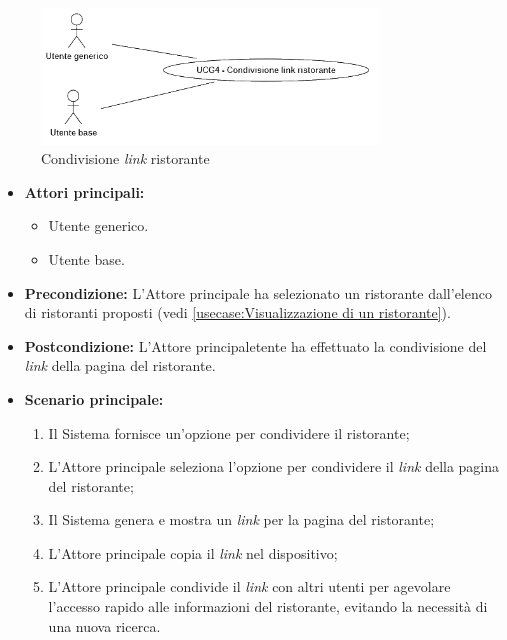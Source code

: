 \newpage
{}
\label{usecase:Condivisione link del ristorante}

\begin{figure}[h]
	\centering
	\includegraphics[width=0.8\textwidth]{./uml/UCG4.png} 
	\caption{Condivisione \textit{link} ristorante}
	\label{fig:UCG4}
  \end{figure}

\begin{itemize}
	\item \textbf{Attori principali:} 
	\begin{itemize}
		\item Utente generico.
		\item Utente base.
	\end{itemize}


	\item \textbf{Precondizione:}
	      L'Attore principale ha selezionato un ristorante dall'elenco di ristoranti
	      proposti (vedi \autoref{usecase:Visualizzazione di un ristorante}).

	\item \textbf{Postcondizione:}
	      L'Attore principaletente ha effettuato la condivisione del \textit{link} della pagina del ristorante.

	\item \textbf{Scenario principale:}
	      \begin{enumerate}
		      \item Il Sistema fornisce un'opzione per condividere il ristorante;
		      \item L'Attore principale seleziona l'opzione per condividere il \textit{link} della pagina del ristorante;
		      \item Il Sistema genera e mostra un \textit{link} per la pagina del ristorante;
		      \item L'Attore principale copia il \textit{link} nel dispositivo;
		      \item L'Attore principale condivide il \textit{link} con altri utenti per agevolare l'accesso rapido alle
		            informazioni del ristorante, evitando la necessità di una nuova ricerca.
	      \end{enumerate}
\end{itemize}
